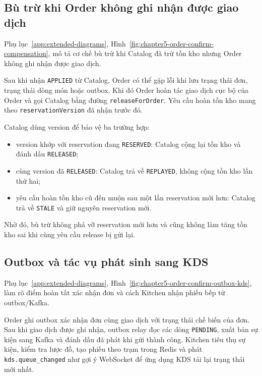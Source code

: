 \subsection{Bù trừ khi Order không ghi nhận được giao dịch}

Phụ lục~\ref{app:extended-diagrams}, Hình~\ref{fig:chapter5-order-confirm-compensation}, mô tả cơ chế bù trừ khi Catalog đã trừ tồn kho nhưng Order không ghi nhận được giao dịch.

Sau khi nhận \texttt{APPLIED} từ Catalog, Order có thể gặp lỗi khi lưu trạng thái đơn, trạng thái dòng món hoặc outbox. Khi đó Order hoàn tác giao dịch cục bộ của Order và gọi Catalog bằng đường \texttt{releaseForOrder}. Yêu cầu hoàn tồn kho mang theo \texttt{reservationVersion} đã nhận trước đó.

Catalog dùng version để bảo vệ ba trường hợp:

\begin{itemize}
  \item version khớp với reservation đang \texttt{RESERVED}: Catalog cộng lại tồn kho và đánh dấu \texttt{RELEASED};
  \item cùng version đã \texttt{RELEASED}: Catalog trả về \texttt{REPLAYED}, không cộng tồn kho lần thứ hai;
  \item yêu cầu hoàn tồn kho cũ đến muộn sau một lần reservation mới hơn: Catalog trả về \texttt{STALE} và giữ nguyên reservation mới.
\end{itemize}

Nhờ đó, bù trừ không phá vỡ reservation mới hơn và cũng không làm tăng tồn kho sai khi cùng yêu cầu release bị gửi lại.

\subsection{Outbox và tác vụ phát sinh sang KDS}

Phụ lục~\ref{app:extended-diagrams}, Hình~\ref{fig:chapter5-order-confirm-outbox-kds}, làm rõ điểm hoàn tất xác nhận đơn và cách Kitchen nhận phiếu bếp từ outbox/Kafka.

Order ghi outbox xác nhận đơn cùng giao dịch với trạng thái chế biến của đơn. Sau khi giao dịch được ghi nhận, outbox relay đọc các dòng \texttt{PENDING}, xuất bản sự kiện sang Kafka và đánh dấu đã phát khi gửi thành công. Kitchen tiêu thụ sự kiện, kiểm tra lược đồ, tạo phiếu theo trạm trong Redis và phát \texttt{kds.queue\_changed} như gợi ý WebSocket để ứng dụng KDS tải lại trạng thái mới nhất.

